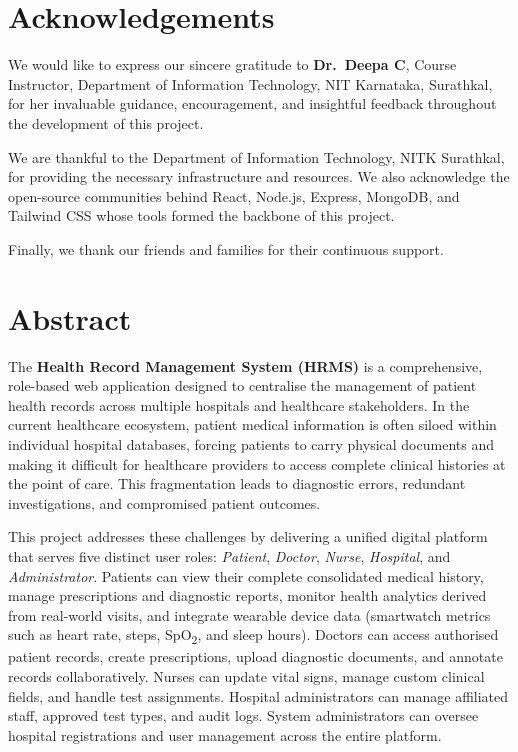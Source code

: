 \documentclass[12pt,a4paper]{report}
\begin{document}
\chapter*{Acknowledgements}

We would like to express our sincere gratitude to \textbf{Dr.\ Deepa C}, Course Instructor, Department of Information Technology, NIT Karnataka, Surathkal, for her invaluable guidance, encouragement, and insightful feedback throughout the development of this project.

We are thankful to the Department of Information Technology, NITK Surathkal, for providing the necessary infrastructure and resources. We also acknowledge the open-source communities behind React, Node.js, Express, MongoDB, and Tailwind CSS whose tools formed the backbone of this project.

Finally, we thank our friends and families for their continuous support.

\chapter*{Abstract}

The \textbf{Health Record Management System (HRMS)} is a comprehensive, role-based web application designed to centralise the management of patient health records across multiple hospitals and healthcare stakeholders. In the current healthcare ecosystem, patient medical information is often siloed within individual hospital databases, forcing patients to carry physical documents and making it difficult for healthcare providers to access complete clinical histories at the point of care. This fragmentation leads to diagnostic errors, redundant investigations, and compromised patient outcomes.

This project addresses these challenges by delivering a unified digital platform that serves five distinct user roles: \textit{Patient}, \textit{Doctor}, \textit{Nurse}, \textit{Hospital}, and \textit{Administrator}. Patients can view their complete consolidated medical history, manage prescriptions and diagnostic reports, monitor health analytics derived from real-world visits, and integrate wearable device data (smartwatch metrics such as heart rate, steps, SpO\textsubscript{2}, and sleep hours). Doctors can access authorised patient records, create prescriptions, upload diagnostic documents, and annotate records collaboratively. Nurses can update vital signs, manage custom clinical fields, and handle test assignments. Hospital administrators can manage affiliated staff, approved test types, and audit logs. System administrators can oversee hospital registrations and user management across the entire platform.
\end{document}
